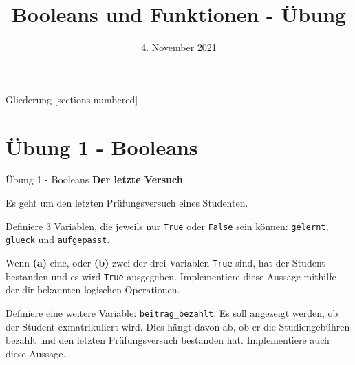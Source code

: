 



\title{Booleans und Funktionen - Übung}
\date{4. November 2021}


\maketitle

\begin{frame}{Gliederung}
	[sections numbered]
	\tableofcontents
\end{frame}


\section{Übung 1 - Booleans}

\begin{frame}{Übung 1 - Booleans}
	\textbf{Der letzte Versuch}
	\linebreak
	
	Es geht um den letzten Prüfungsversuch eines Studenten.
	
	Definiere 3 Variablen, die jeweils nur \alert{\texttt{True}} oder \alert{\texttt{False}} sein können: \texttt{gelernt}, \texttt{glueck} und \texttt{aufgepasst}.
	
	Wenn \textbf{(a)} eine, oder \textbf{(b)} zwei der drei Variablen \alert{\texttt{True}} sind, hat der Student bestanden und es wird \alert{\texttt{True}} ausgegeben. Implementiere diese Aussage mithilfe der dir bekannten logischen Operationen.
	
	Definiere eine weitere Variable: \texttt{beitrag\_bezahlt}. Es soll angezeigt werden, ob der Student exmatrikuliert wird. Dies hängt davon ab, ob er die Studiengebühren bezahlt und den letzten Prüfungsversuch bestanden hat. Implementiere auch diese Aussage.

\end{frame}


